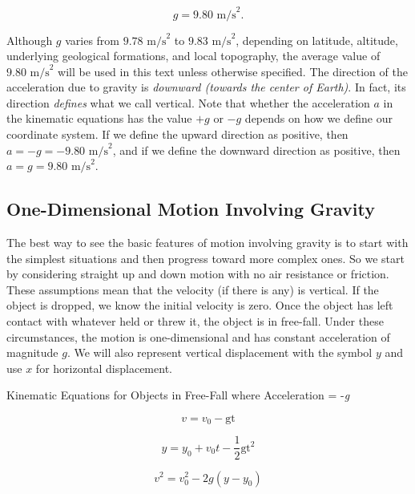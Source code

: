 \documentclass[
]{book}
\begin{document}
\leavevmode{}%
\[{{g = 9}\text{.}\text{80\ m/s}^{2}}\text{.}{}\]

Although \(g{}\) varies from \({9\text{.}\text{78\ m/s}^{2}}{}\) to
\({9\text{.}\text{83\ m/s}^{2}}{}\), depending on latitude, altitude,
underlying geological formations, and local topography, the average
value of \({9\text{.}\text{80\ m/s}^{2}}{}\) will be used in this text
unless otherwise specified. The direction of the acceleration due to
gravity is \emph{downward (towards the center of Earth)}. In fact, its
direction \emph{defines} what we call vertical. Note that whether the
acceleration \(a{}\) in the kinematic equations has the value \({+ g}{}\) or
\({- g}{}\) depends on how we define our coordinate system. If we define
the upward direction as positive, then
\({{{a = {- g}} = {- 9}}\text{.}\text{80\ m/s}^{2}}{}\), and if we define
the downward direction as positive, then
\({{{a = g} = 9}\text{.}\text{80\ m/s}^{2}}{}\).

\hypertarget{fs-id2854808}{}
\hypertarget{one-dimensional-motion-involving-gravity}{%
\subsection{One-Dimensional Motion Involving Gravity}\label{one-dimensional-motion-involving-gravity}}

The best way to see the basic features of motion involving gravity is to
start with the simplest situations and then progress toward more complex
ones. So we start by considering straight up and down motion with no air
resistance or friction. These assumptions mean that the velocity (if
there is any) is vertical. If the object is dropped, we know the initial
velocity is zero. Once the object has left contact with whatever held or
threw it, the object is in free-fall. Under these circumstances, the
motion is one-dimensional and has constant acceleration of magnitude
\(g{}\). We will also represent vertical displacement with the symbol
\(y{}\) and use \(x{}\) for horizontal displacement.

\hypertarget{fs-id1931991}{}
Kinematic Equations for Objects in Free-Fall where Acceleration = -\emph{g}

\leavevmode{}%
\[{v = {v_{0} - \text{gt}}}{}\]

\leavevmode{}%
\[{{y = {y_{0} + v_{0}}}{t - \frac{1}{2}}\text{gt}^{2}}{}\]

\leavevmode{}%
\[{{v^{2} = {v_{0}^{2} - 2g}}\left( {y - y_{0}} \right)}{}\]
\end{document}
